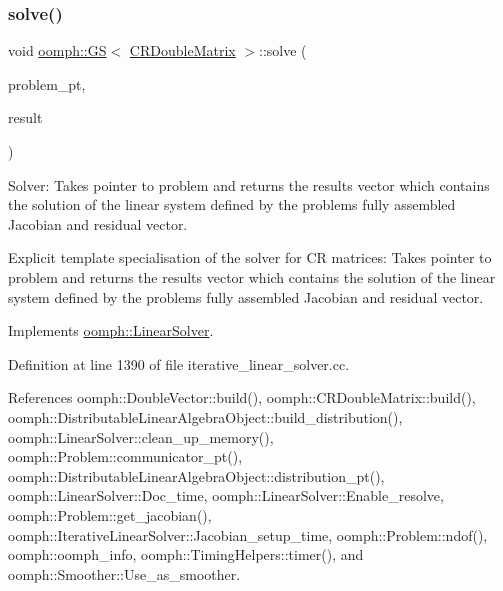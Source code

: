 \mbox{\label{classoomph_1_1GS_3_01CRDoubleMatrix_01_4_a85164d55db2ab10404d5679657e8f6de}} 
\subsubsection{\texorpdfstring{solve()}{solve()}\hspace{0.1cm}{\footnotesize\ttfamily [1/3]}}
{\footnotesize\ttfamily void \hyperlink{classoomph_1_1GS}{oomph\+::\+GS}$<$ \hyperlink{classoomph_1_1CRDoubleMatrix}{C\+R\+Double\+Matrix} $>$\+::solve (\begin{DoxyParamCaption}\item[{\hyperlink{classoomph_1_1Problem}{Problem} $\ast$const \&}]{problem\+\_\+pt,  }\item[{\hyperlink{classoomph_1_1DoubleVector}{Double\+Vector} \&}]{result }\end{DoxyParamCaption})\hspace{0.3cm}{\ttfamily [virtual]}}



Solver\+: Takes pointer to problem and returns the results vector which contains the solution of the linear system defined by the problem\textquotesingle{}s fully assembled Jacobian and residual vector. 

Explicit template specialisation of the solver for CR matrices\+: Takes pointer to problem and returns the results vector which contains the solution of the linear system defined by the problem\textquotesingle{}s fully assembled Jacobian and residual vector. 

Implements \hyperlink{classoomph_1_1LinearSolver_a15ce22542b74ed1826ea485edacbeb6e}{oomph\+::\+Linear\+Solver}.



Definition at line 1390 of file iterative\+\_\+linear\+\_\+solver.\+cc.



References oomph\+::\+Double\+Vector\+::build(), oomph\+::\+C\+R\+Double\+Matrix\+::build(), oomph\+::\+Distributable\+Linear\+Algebra\+Object\+::build\+\_\+distribution(), oomph\+::\+Linear\+Solver\+::clean\+\_\+up\+\_\+memory(), oomph\+::\+Problem\+::communicator\+\_\+pt(), oomph\+::\+Distributable\+Linear\+Algebra\+Object\+::distribution\+\_\+pt(), oomph\+::\+Linear\+Solver\+::\+Doc\+\_\+time, oomph\+::\+Linear\+Solver\+::\+Enable\+\_\+resolve, oomph\+::\+Problem\+::get\+\_\+jacobian(), oomph\+::\+Iterative\+Linear\+Solver\+::\+Jacobian\+\_\+setup\+\_\+time, oomph\+::\+Problem\+::ndof(), oomph\+::oomph\+\_\+info, oomph\+::\+Timing\+Helpers\+::timer(), and oomph\+::\+Smoother\+::\+Use\+\_\+as\+\_\+smoother.

